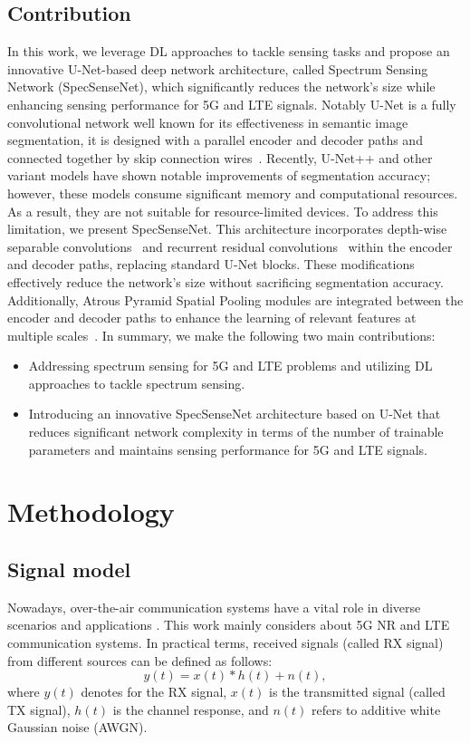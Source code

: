 \documentclass[journal]{IEEEtran} %
\begin{document}
\subsection{Contribution}
In this work, we leverage DL approaches to tackle sensing tasks and propose an innovative U-Net-based deep network architecture, called Spectrum Sensing Network (SpecSenseNet), which significantly reduces the network's size while enhancing sensing performance for 5G and LTE signals. 
Notably U-Net is a fully convolutional network well known for its effectiveness in semantic image segmentation, it is designed with a parallel encoder and decoder paths and connected together by skip connection wires~\cite{ronneberger2015u}. Recently, U-Net++ and other variant models\cite{zhou2019unet++} have shown notable improvements of segmentation accuracy; however, these models consume significant memory and computational resources. 
As a result, they are not suitable for resource-limited devices. 
To address this limitation, we present SpecSenseNet. This architecture incorporates depth-wise separable convolutions~\cite{CholletXception} and recurrent residual convolutions~\cite{AlomNuclei, he2016deep, aghalari2021brain} within the encoder and decoder paths, replacing standard U-Net blocks. These modifications effectively reduce the network's size without sacrificing segmentation accuracy. Additionally, Atrous Pyramid Spatial Pooling modules are integrated between the encoder and decoder paths to enhance the learning of relevant features at multiple scales~\cite{ChenAtrous}.
In summary, we make the following two main contributions:
\begin{itemize}
\item Addressing spectrum sensing for 5G and LTE problems and utilizing DL approaches to tackle spectrum sensing.
\item Introducing an innovative SpecSenseNet architecture based on U-Net that reduces significant network complexity in terms of the number of trainable parameters and maintains sensing performance for 5G and LTE signals.
\end{itemize}


\section{Methodology}
\subsection{Signal model}
Nowadays, over-the-air communication systems have a vital role in diverse scenarios and applications \cite{lin20215g}. This work mainly considers about 5G NR and LTE communication systems. In practical terms, received signals (called RX signal) from different sources can be defined as follows:
\begin{equation}
    {y(t) = x(t) \ast h(t) + n(t)},
    \label{eq:rxsig}
\end{equation}
where ${y(t)}$ denotes for the RX signal, ${x(t)}$ is the transmitted signal (called TX signal),  ${h(t)}$ is the channel response, and ${n(t)}$ refers to additive white Gaussian noise (AWGN).
\end{document}
